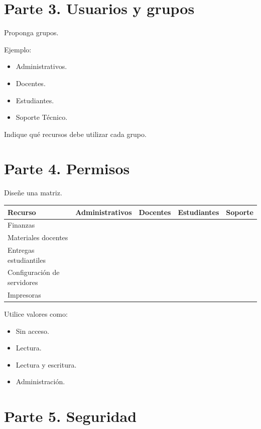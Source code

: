 \documentclass[
  spanish,
  letterpaper,
]{scrbook}
\newcounter{none} %
\providecommand{\tightlist}{%
  \setlength{\itemsep}{0pt}\setlength{\parskip}{0pt}}
\begin{document}
\section{Parte 3. Usuarios y grupos}\label{parte-3.-usuarios-y-grupos}

Proponga grupos.

Ejemplo:

\begin{itemize}
\tightlist
\item
  Administrativos.
\item
  Docentes.
\item
  Estudiantes.
\item
  Soporte Técnico.
\end{itemize}

Indique qué recursos debe utilizar cada grupo.

\section{Parte 4. Permisos}\label{parte-4.-permisos}

Diseñe una matriz.

{\def\LTcaptype{none} %
\begin{longtable}[]{@{}lllll@{}}
\toprule\noalign{}
Recurso & Administrativos & Docentes & Estudiantes & Soporte \\
\midrule\noalign{}
\endhead
\bottomrule\noalign{}
\endlastfoot
Finanzas & & & & \\
Materiales docentes & & & & \\
Entregas estudiantiles & & & & \\
Configuración de servidores & & & & \\
Impresoras & & & & \\
\end{longtable}
}

Utilice valores como:

\begin{itemize}
\tightlist
\item
  Sin acceso.
\item
  Lectura.
\item
  Lectura y escritura.
\item
  Administración.
\end{itemize}

\section{Parte 5. Seguridad}\label{parte-5.-seguridad}
\end{document}
